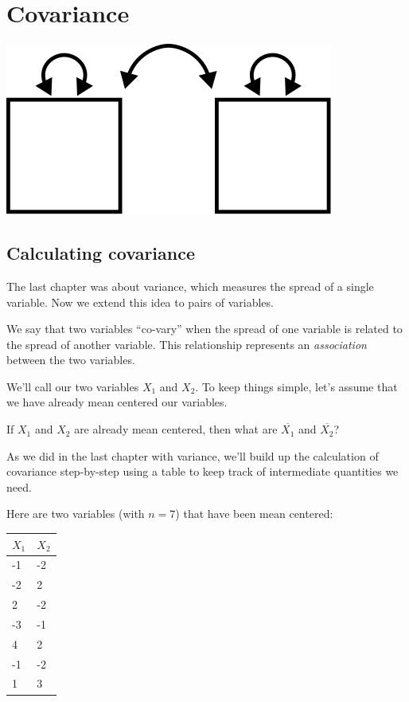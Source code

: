 \documentclass[
]{book}
\begin{document}
\hypertarget{covariance}{%
\chapter{Covariance}\label{covariance}}

\begin{center}\includegraphics{graphics/covariance} \end{center}

\hypertarget{covariance-calculating}{%
\section{Calculating covariance}\label{covariance-calculating}}

The last chapter was about variance, which measures the spread of a single variable. Now we extend this idea to pairs of variables.

We say that two variables ``co-vary'' when the spread of one variable is related to the spread of another variable. This relationship represents an \emph{association} between the two variables.

We'll call our two variables \(X_{1}\) and \(X_{2}\). To keep things simple, let's assume that we have already mean centered our variables.

If \(X_{1}\) and \(X_{2}\) are already mean centered, then what are \(\overline{X_{1}}\) and \(\overline{X_{2}}\)?

As we did in the last chapter with variance, we'll build up the calculation of covariance step-by-step using a table to keep track of intermediate quantities we need.

Here are two variables (with \(n = 7\)) that have been mean centered:

\begin{longtable}[]{@{}ll@{}}
\toprule
\(X_{1}\) & \(X_{2}\) \\
\midrule
\endhead
-1 & -2 \\
-2 & 2 \\
2 & -2 \\
-3 & -1 \\
4 & 2 \\
-1 & -2 \\
1 & 3 \\
\bottomrule
\end{longtable}
\end{document}
